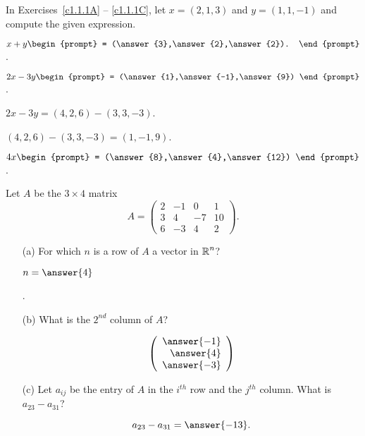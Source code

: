 \documentclass{ximera}
\begin{document}
\noindent In Exercises~\ref{c1.1.1A} -- \ref{c1.1.1C}, let $x=(2,1,3)$ and 
$y=(1,1,-1)$ and compute the given expression.
\begin{exercise}  \label{c1.1.1A}
  $x+y\begin{prompt}
    = (\answer{3},\answer{2},\answer{2}).
  \end{prompt}$.
\end{exercise}
\begin{exercise}  \label{c1.1.1B}
  $2x-3y\begin{prompt}
    = (\answer{1},\answer{-1},\answer{9})
  \end{prompt}$.
  \begin{hint}
    $2x - 3y = (4,2,6) - (3,3,-3)$.
  \end{hint}
  \begin{hint}
    $(4,2,6) - (3,3,-3) = (1,-1,9)$.
  \end{hint}  
\end{exercise}
\begin{exercise}  \label{c1.1.1C}
  $4x\begin{prompt}
    = (\answer{8},\answer{4},\answer{12})
    \end{prompt}$.
\end{exercise}

\begin{exercise} \label{c1.1.2}
Let $A$ be the $3\times 4$ matrix
\[
A=\left(\begin{array}{rrrr} 2 & -1 & 0 & 1 \\ 3 & 4 & -7 & 10\\
        6 & -3 & 4 & 2 \end{array}\right).
\]
\begin{enumerate}
\item[(a)]  For which $n$ is a row of $A$ a vector in $\mbox{$\Bbb{R}$}^n$? \begin{prompt}$n = \answer{4}$\end{prompt}.
\item[(b)]  What is the $2^{nd}$ column of $A$?
  \begin{prompt}
    \[
      \left(\begin{array}{r} \answer{-1} \\ \answer{4} \\ \answer{-3} \end{array} \right)
    \]
  \end{prompt}
\item[(c)] Let $a_{ij}$ be the entry of $A$ in the $i^{th}$ row
  and the $j^{th}$ column.  What is $a_{23}-a_{31}$?
  \begin{prompt}
    \[
      a_{23}-a_{31} = \answer{-13}.
    \]
  \end{prompt}
\end{enumerate}
\end{exercise}
\end{document}
